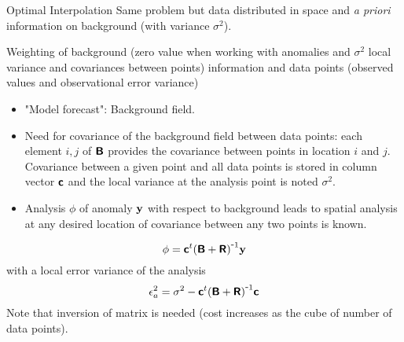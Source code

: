 \begin{frame}[allowframebreaks]{Optimal Interpolation}
Same problem but data distributed in space and {\it a priori} information on background (with variance $\sigma^2$). 

Weighting of background (zero value when working with anomalies and $\sigma^2$ local variance and covariances between points) information and data points (observed values and observational error variance) 

\begin{itemize}
\item
"Model forecast": Background field.
\item
Need for  covariance of the background field between data points: each element $i,j$ of $\mbox{\boldmath $ \protect\mathsf{B} $}$ provides the covariance between points in location $i$ and $j$. Covariance between a given point and all data points is stored in column vector $\mbox{\boldmath $ \protect\mathsf{c} $}$ and the local variance at the analysis point is noted $\sigma^2$.
\item
Analysis $\phi$ of anomaly $\mbox{\boldmath $ \protect\mathrm{y} $}$ with respect to background leads to spatial analysis at any desired location of covariance between any two points is known.
\end{itemize}

\begin{equation}
\phi= {\mbox{\boldmath $ \protect\mathsf{c} $}}^t {\left( \mbox{\boldmath $ \protect\mathsf{B} $} + \mbox{\boldmath $ \protect\mathsf{R} $} \right)}^{ \mbox{\small{-}} 1} 
\mbox{\boldmath $ \protect\mathrm{y} $}
\label{eq:analyzedfield}
\end{equation}
with a local error variance of the analysis
\begin{equation}
\epsilon_a^2=\sigma^2 - {\mbox{\boldmath $ \protect\mathsf{c} $}}^t {\left( \mbox{\boldmath $ \protect\mathsf{B} $} + \mbox{\boldmath $ \protect\mathsf{R} $} \right)}^{ \mbox{\small{-}} 1} \mbox{\boldmath $ \protect\mathsf{c} $}
\end{equation}
Note that inversion of matrix is needed (cost increases as the cube of number of data points).

\end{frame}


